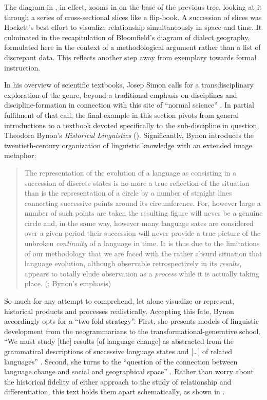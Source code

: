 \documentclass[output=paper]{langscibook}
\begin{document}
\largerpage[1]The diagram in , in effect, zooms in on the base of the previous tree, looking at it through a series of cross-sectional slices like a flip-book. A succession of slices was Hockett's best effort to visualize relationship simultaneously in space and time. It culminated in the recapitulation of Bloomfield's diagram of dialect geography, formulated here in the context of a methodological argument rather than a list of discrepant data. This reflects another step away from exemplary towards formal instruction.

In his overview of scientific textbooks, Josep Simon calls for a transdisciplinary exploration of the genre, beyond a traditional emphasis on disciplines and dis\-ci\-pline-formation in connection with this site of ``normal science'' \citep[475]{Simon2016}. In partial fulfilment of that call, the final example in this section pivots from general introductions to a textbook devoted specifically to the sub-discipline in question, Theodora Bynon's \emph{Historical Linguistics} (\citeyear{Bynon1977}). Significantly, Bynon introduces the twentieth-century organization of linguistic knowledge with an extended image metaphor:

\begin{quotation}
The representation of the evolution of a language as consisting in a succession of discrete states is no more a true reflection of the situation than is the representation of a circle by a number of straight lines connecting successive points around its circumference. For, however large a number of such points are taken the resulting figure will never be a genuine circle and, in the same way, however many language sates are considered over a given period their succession will never provide a true picture of the unbroken \emph{continuity} of a language in time. It is thus due to the limitations of our methodology that we are faced with the rather absurd situation that language evolution, although observable retrospectively in its \emph{results}, appears to totally elude observation as a \emph{process} while it is actually taking place. (\citealt[2]{Bynon1977}; Bynon's emphasis)
\end{quotation}

So much for any attempt to comprehend, let alone visualize or represent, historical products and processes realistically. Accepting this fate, Bynon accordingly opts for a ``two-fold strategy''. First, she presents models of linguistic development from the neogrammarians to the transformational-generative school. ``We must study [the] results [of language change] as abstracted from the grammatical descriptions of successive language states and […] of related languages'' \citep[6]{Bynon1977}. Second, she turns to the ``question of the connection between language change and social and geographical space'' \citep[6]{Bynon1977}. Rather than worry about the historical fidelity of either approach to the study of relationship and differentiation, this text holds them apart schematically, as shown in .
\end{document}
